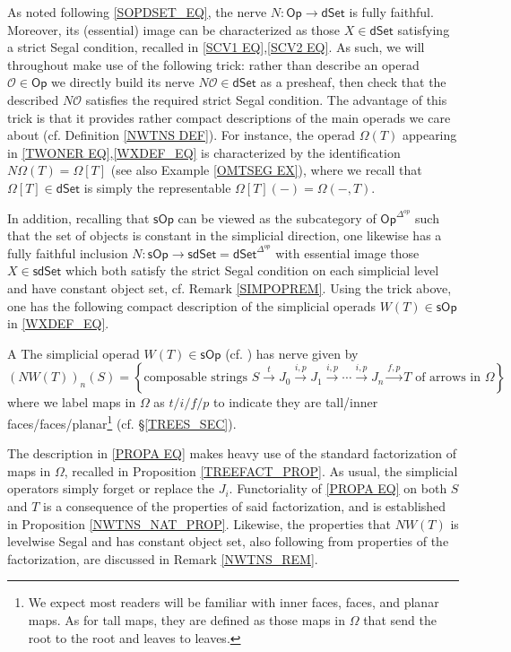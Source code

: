 \documentclass[a4paper,10pt
,draft
]{article}%
\numberwithin{equation}{section}
\numberwithin{figure}{section}
\theoremstyle{definition} %
\newcommand{\Op}{\mathsf{Op}}%
\newcommand{\sOp}{\ensuremath{\mathsf{sOp}}}%
\renewcommand{\O}{\ensuremath{\mathcal O}}
\newcommand{\1}{\ensuremath{\mathbbm 1}}%
\begin{document}
As noted following \eqref{SOPDSET_EQ},
the nerve $N\colon \mathsf{Op} \to \mathsf{dSet}$
is fully faithful.
Moreover, its (essential) image
can be characterized as those 
$X \in \mathsf{dSet}$ satisfying a strict Segal condition,
recalled in \eqref{SCV1 EQ},\eqref{SCV2 EQ}.
As such, we will throughout make use of the following trick:
rather than describe an operad $\O \in \mathsf{Op}$
we directly build its nerve 
$N\O \in \mathsf{dSet}$ as a presheaf,
then check that the described $N\O$ satisfies the required strict Segal condition.
The advantage of this trick is that it provides rather compact descriptions of the main operads we care about 
(cf. Definition \ref{NWTNS DEF}).
For instance, 
the operad $\Omega(T)$ appearing in 
\eqref{TWONER EQ},\eqref{WXDEF_EQ}
is characterized by the identification $N\Omega(T) =\Omega[T]$
(see also Example \ref{OMTSEG EX}), 
where we recall that $\Omega[T]\in \mathsf{dSet}$
is simply the representable $\Omega[T](-) = \Omega(-,T)$.


In addition, recalling that $\sOp$ can be viewed as the subcategory
of $\Op^{\Delta^{op}}$ such that the set of objects is constant in the simplicial direction,
one likewise has a fully faithful inclusion
$N\colon \sOp \to \mathsf{sdSet} = \mathsf{dSet}^{\Delta^{op}}$
with essential image those
$X \in \mathsf{sdSet}$
which both satisfy the strict Segal condition on each simplicial level and have constant object set, 
cf. Remark \ref{SIMPOPREM}.
Using the trick above,
one has the following compact description
of the simplicial operads $W(T) \in \sOp$ in \eqref{WXDEF_EQ}.

\begin{customprop}{A}\label{PROPA PROP}
The simplicial operad $W(T) \in \sOp$
(cf. \cite[(4.1)]{CM13b})
has nerve given by
\begin{equation}\label{PROPA EQ}
	\left(NW(T)\right)_{n}(S)
=
	\left\{
	\text{composable strings }
	S \xrightarrow{t} 
	J_0 \xrightarrow{i,p} 
	J_1 \xrightarrow{i,p} 
	\cdots \xrightarrow{i,p}
	J_n \xrightarrow{f,p}
	T
	\text{ of arrows in $\Omega$}
\right\}
\end{equation}
where we label maps in $\Omega$ as
$t/i/f/p$
to indicate they are 
tall/inner faces/faces/planar\footnote{
We expect most readers will be familiar with inner faces, faces, and planar maps. 
As for tall maps, they are defined 
as those maps in $\Omega$
that send the root to the root and leaves to leaves.
}
(cf. \S \ref{TREES_SEC}).
\end{customprop}
The description in \eqref{PROPA EQ}
makes heavy use of the standard factorization of maps in $\Omega$,
recalled in Proposition \ref{TREEFACT_PROP}.
As usual, the simplicial operators simply forget or replace the $J_i$.
Functoriality of \eqref{PROPA EQ} on both $S$ and $T$
is a consequence of the properties of said factorization,
and is established in Proposition \ref{NWTNS_NAT_PROP}.
Likewise, the properties that 
$NW(T)$ is levelwise Segal and 
has constant object set, also following from properties of the factorization, are discussed in Remark \ref{NWTNS_REM}.
\end{document}
